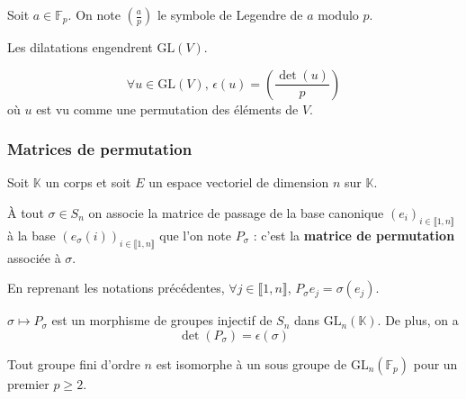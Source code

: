 	
	\begin{notation}
		Soit $a \in \mathbb{F}_p$. On note $\left( \frac{a}{p} \right)$ le symbole de Legendre de $a$ modulo $p$.
	\end{notation}
	
	\begin{lemma}
		Les dilatations engendrent $\mathrm{GL}(V)$.
	\end{lemma}
	
	
	\begin{theorem}
		\[ \forall u \in \mathrm{GL}(V), \, \epsilon(u) = \left( \frac{\det(u)}{p} \right) \]
		où $u$ est vu comme une permutation des éléments de $V$.
	\end{theorem}
	
	\subsubsection{Matrices de permutation}
	
	
	Soit $\mathbb{K}$ un corps et soit $E$ un espace vectoriel de dimension $n$ sur $\mathbb{K}$.
	
	\begin{definition}
		À tout $\sigma \in S_n$ on associe la matrice de passage de la base canonique $(e_i)_{i \in \llbracket 1, n \rrbracket}$ à la base $(e_\sigma(i))_{i \in \llbracket 1, n \rrbracket}$ que l'on note $P_{\sigma}$ : c'est la \textbf{matrice de permutation} associée à $\sigma$.
	\end{definition}
	
	\begin{remark}
		En reprenant les notations précédentes, $\forall j \in \llbracket 1, n \rrbracket$, $P_{\sigma} e_j = \sigma(e_j)$.
	\end{remark}
	
	\begin{proposition}
		$\sigma \mapsto P_{\sigma}$ est un morphisme de groupes injectif de $S_n$ dans $\mathrm{GL}_n(\mathbb{K})$. De plus, on a
		\[ \det(P_{\sigma}) = \epsilon(\sigma) \]
	\end{proposition}
	
	\begin{corollary}
		Tout groupe fini d'ordre $n$ est isomorphe à un sous groupe de $\mathrm{GL}_n(\mathbb{F}_p)$ pour un premier $p \geq 2$.
	\end{corollary}
	
